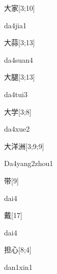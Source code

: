 \begin{verbete}[da4jia1]{大家}[3;10]
\begin{pronuncia}{da4jia1}
\end{pronuncia}
\end{verbete}

\begin{verbete}[da4suan4]{大蒜}[3;13]
\begin{pronuncia}{da4suan4}
\end{pronuncia}
\end{verbete}

\begin{verbete}[da4tui3]{大腿}[3;13]
\begin{pronuncia}{da4tui3}
\end{pronuncia}
\end{verbete}

\begin{verbete}[da4xue2]{大学}[3;8]
\begin{pronuncia}{da4xue2}
\end{pronuncia}
\end{verbete}

\begin{verbete}{大洋洲}[3;9;9]
\begin{pronuncia}{Da4yang2zhou1}
\end{pronuncia}
\end{verbete}

\begin{verbete}[dai4]{带}[9]
\begin{pronuncia}{dai4}
\end{pronuncia}
\end{verbete}

\begin{verbete}[dai4]{戴}[17]
\begin{pronuncia}{dai4}
\end{pronuncia}
\end{verbete}

\begin{verbete}{担心}[8;4]
\begin{pronuncia}{dan1xin1}
\end{pronuncia}
\end{verbete}

